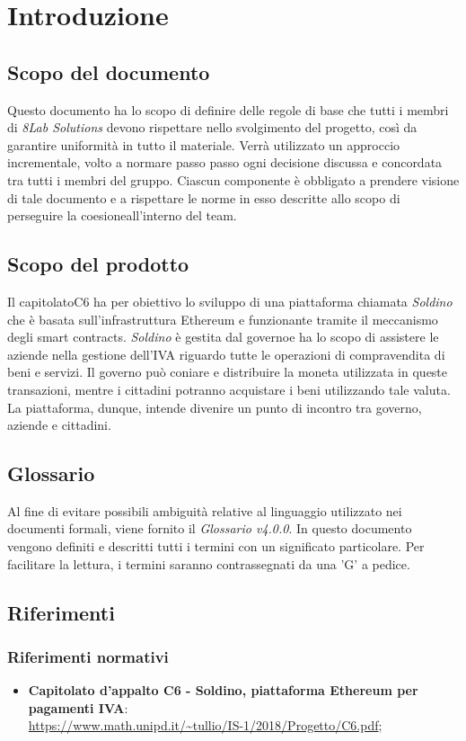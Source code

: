 \section{Introduzione}
\subsection{Scopo del documento}
Questo documento ha lo scopo di definire delle regole di base che tutti i membri 
di \textit{8Lab Solutions} devono rispettare nello svolgimento del progetto, 
così da garantire uniformità in tutto il materiale. Verrà utilizzato un 
approccio incrementale, volto a normare passo passo ogni decisione discussa e 
concordata tra tutti i membri del gruppo. Ciascun componente è obbligato a 
prendere visione di tale documento e a rispettare le norme in esso descritte 
allo scopo di perseguire la coesione\glosp all'interno del team.

\subsection{Scopo del prodotto}
Il capitolato\glosp C6 ha per obiettivo lo sviluppo di una piattaforma chiamata \textit{Soldino} che è basata sull'infrastruttura Ethereum\glo{} e funzionante tramite il meccanismo degli smart contracts\glo{}. \textit{Soldino} è gestita dal governo\glosp e ha lo scopo di assistere le aziende nella gestione dell'IVA riguardo tutte le operazioni di compravendita di beni e servizi. Il governo può coniare e 
distribuire la moneta utilizzata in queste transazioni, mentre i cittadini 
potranno acquistare i beni utilizzando tale valuta. La piattaforma, dunque, 
intende divenire un punto di incontro tra governo, aziende e cittadini.

\subsection{Glossario}
Al fine di evitare possibili ambiguità relative al linguaggio utilizzato nei 
documenti formali, viene fornito il \textit{Glossario v4.0.0}. In questo 
documento vengono definiti e descritti tutti i termini con un significato 
particolare. Per facilitare la lettura, i termini saranno contrassegnati da una 
'G' a pedice.

\subsection{Riferimenti}
\subsubsection{Riferimenti normativi}
\begin{itemize}

	\item \textbf{Capitolato d'appalto C6 - Soldino, piattaforma Ethereum per pagamenti IVA}: \\
		\url{https://www.math.unipd.it/~tullio/IS-1/2018/Progetto/C6.pdf};
\end{itemize}

